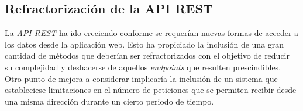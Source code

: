 \subsection{Refractorización de la API REST}

La \emph{API REST} ha ido creciendo conforme se requerían nuevas formas de acceder a los datos desde la aplicación web. Esto ha propiciado la inclusión de una gran cantidad de métodos que deberían ser refractorizados con el objetivo de reducir su complejidad y deshacerse de aquellos \emph{endpoints} que resulten prescindibles. Otro punto de mejora a considerar implicaría la inclusión de un sistema que estableciese limitaciones en el número de peticiones que se permiten recibir desde una misma dirección durante un cierto periodo de tiempo.
